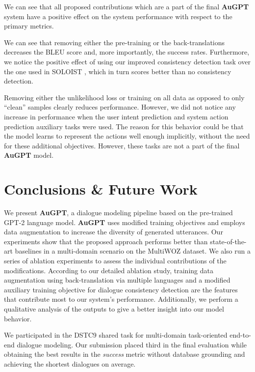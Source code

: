 \documentclass[letterpaper]{article} %
\begin{document}
We can see that all proposed contributions which are a part of the final \textbf{AuGPT} system have a positive effect on the system performance with respect to the primary metrics.

We can see that removing either the pre-training or the back-translations decreases the BLEU score and, more importantly, the success rates. Furthermore, we notice the positive effect of using our improved consistency detection task over the one used in SOLOIST \cite{peng2020}, which in turn scores better than no consistency detection. 

Removing either the unlikelihood loss or training on all data as opposed to only “clean” samples clearly reduces performance.
However, we did not notice any increase in performance when the user intent prediction and system action prediction auxiliary tasks were used.
The reason for this behavior could be that the model learns to represent the actions well enough implicitly, without the need for these additional objectives.
However, these tasks are not a part of the final \textbf{AuGPT} model.


\section{Conclusions \& Future Work}
We present \textbf{AuGPT}, a dialogue modeling pipeline based on the pre-trained GPT-2 language model.
\textbf{AuGPT} uses modified training objectives and employs data augmentation to increase the diversity of generated utterances.
Our experiments show that the proposed approach performs better than state-of-the-art baselines in a multi-domain scenario on the MultiWOZ dataset.
We also run a series of ablation experiments to assess the individual contributions of the modifications.
According to our detailed ablation study, 
training data augmentation using back-translation via multiple languages and a modified auxiliary training objective for dialogue consistency detection are the features that contribute most to our system's performance.
Additionally, we perform a qualitative analysis of the outputs to give a better insight into our model behavior.

We participated in the DSTC9 shared task for multi-domain task-oriented end-to-end dialogue modeling.
Our submission placed third in the final evaluation while obtaining the best results in the \emph{success} metric without database grounding and achieving the shortest dialogues on average.
\end{document}
